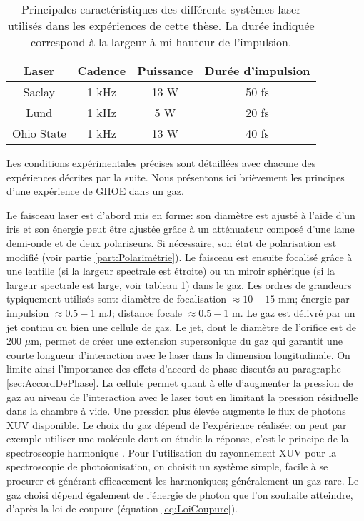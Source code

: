 \begin{table}[ht]
\begin{center}
\begin{tabular}{|c||c|c|c|}
\hline
Laser & Cadence & Puissance & Durée d'impulsion \\
\hline
Saclay & 1 kHz & 13 W & 50 fs \\
\hline
Lund & 1 kHz & 5 W & 20 fs  \\
\hline
Ohio State & 1 kHz & 13 W & 40 fs\\
\hline
\end{tabular}
\end{center}
\caption{Principales caractéristiques des différents systèmes laser utilisés dans les expériences de cette thèse. La durée indiquée correspond à la largeur à mi-hauteur de l'impulsion.}
\label{tab:Lasers}
\end{table}

Les conditions expérimentales précises sont détaillées avec chacune des expériences décrites par la suite. Nous présentons ici brièvement les principes d'une expérience de GHOE dans un gaz.

Le faisceau laser est d'abord mis en forme: son diamètre est ajusté à l'aide d'un iris et son énergie peut être ajustée grâce à un atténuateur composé d'une lame demi-onde et de deux polariseurs. Si nécessaire, son état de polarisation est modifié (voir partie \ref{part:Polarimétrie}). Le faisceau est ensuite focalisé grâce à une lentille (si la largeur spectrale est étroite) ou un miroir sphérique (si la largeur spectrale est large, voir tableau \ref{tab:Lasers}) dans le gaz. Les ordres de grandeurs typiquement utilisés sont: diamètre de focalisation $\approx 10 - 15$ mm; énergie par impulsion $\approx 0.5 - 1$ mJ; distance focale $\approx 0.5 - 1$ m. Le gaz est délivré par un jet continu ou bien une cellule de gaz. Le jet, dont le diamètre de l'orifice est de 200 $\mu$m, permet de créer une extension supersonique du gaz qui garantit une courte longueur d'interaction avec le laser dans la dimension longitudinale. On limite ainsi l'importance des effets d'accord de phase discutés au paragraphe \ref{sec:AccordDePhase}. La cellule permet quant à elle d'augmenter la pression de gaz au niveau de l'interaction avec le laser tout en limitant la pression résiduelle dans la chambre à vide. Une pression plus élevée augmente le flux de photons XUV disponible. Le choix du gaz dépend de l'expérience réalisée: on peut par exemple utiliser une molécule dont on étudie la réponse, c'est le principe de la spectroscopie harmonique . Pour l'utilisation du rayonnement XUV pour la spectroscopie de photoionisation, on choisit un système simple, facile à se procurer et générant efficacement les harmoniques; généralement un gaz rare. Le gaz choisi dépend également de l'énergie de photon que l'on souhaite atteindre, d'après la loi de coupure (équation \ref{eq:LoiCoupure}).

